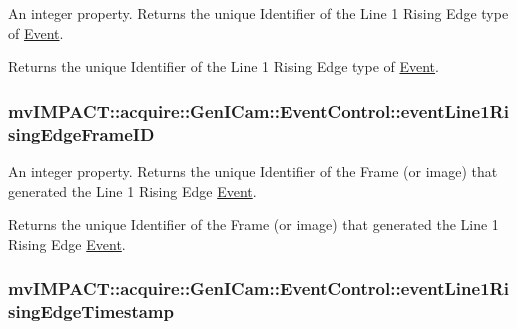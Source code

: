 An integer property. Returns the unique Identifier of the Line 1 Rising Edge type of \hyperlink{classmv_i_m_p_a_c_t_1_1acquire_1_1_event}{Event}. 

Returns the unique Identifier of the Line 1 Rising Edge type of \hyperlink{classmv_i_m_p_a_c_t_1_1acquire_1_1_event}{Event}. \hypertarget{classmv_i_m_p_a_c_t_1_1acquire_1_1_gen_i_cam_1_1_event_control_a4c1dcfd7bf90bad0ce6ac08d2836c489}{
\subsubsection[{event\+Line1\+Rising\+Edge\+Frame\+I\+D}]{ mv\+I\+M\+P\+A\+C\+T\+::acquire\+::\+Gen\+I\+Cam\+::\+Event\+Control\+::event\+Line1\+Rising\+Edge\+Frame\+I\+D}}\label{classmv_i_m_p_a_c_t_1_1acquire_1_1_gen_i_cam_1_1_event_control_a4c1dcfd7bf90bad0ce6ac08d2836c489}


An integer property. Returns the unique Identifier of the Frame (or image) that generated the Line 1 Rising Edge \hyperlink{classmv_i_m_p_a_c_t_1_1acquire_1_1_event}{Event}. 

Returns the unique Identifier of the Frame (or image) that generated the Line 1 Rising Edge \hyperlink{classmv_i_m_p_a_c_t_1_1acquire_1_1_event}{Event}. \hypertarget{classmv_i_m_p_a_c_t_1_1acquire_1_1_gen_i_cam_1_1_event_control_a899b8fe77d975c91532a2a536678a6be}{
\subsubsection[{event\+Line1\+Rising\+Edge\+Timestamp}]{ mv\+I\+M\+P\+A\+C\+T\+::acquire\+::\+Gen\+I\+Cam\+::\+Event\+Control\+::event\+Line1\+Rising\+Edge\+Timestamp}}\label{classmv_i_m_p_a_c_t_1_1acquire_1_1_gen_i_cam_1_1_event_control_a899b8fe77d975c91532a2a536678a6be}


